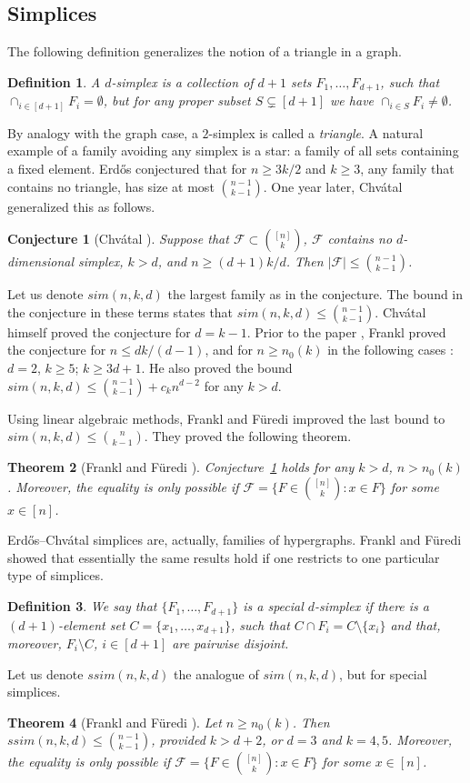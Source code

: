 \documentclass[graybox]{svmult}
\renewcommand{\le}{\leqslant}
\renewcommand{\ge}{\geqslant}
\newcommand{\ff}{\mathcal{F}}
\newtheorem{thm}{Theorem}
\newtheorem{conj}{Conjecture}
\newtheorem{defn}[thm]{Definition}
\begin{document}
\subsection{Simplices}\label{sec43}
The following definition generalizes the notion of a triangle in a graph.
\begin{defn}\label{defsim}
  A {\it $d$-simplex} is a collection of $d+1$ sets $F_1,\ldots, F_{d+1}$, such that $\cap_{i\in[d+1]} F_i=\emptyset$, but for any proper subset $S\subsetneq [d+1]$ we have $\cap_{i\in S} F_i\ne \emptyset$.
\end{defn}
By analogy with the graph case, a $2$-simplex is called a {\it triangle}. A natural example of a family avoiding any simplex is a star: a family of all sets containing a fixed element. Erd\H os \cite{E4} conjectured that for $n\ge 3k/2$ and $k\ge 3$, any family that contains no triangle, has size at most ${n-1\choose k-1}$. One year later, Chv\'atal \cite{Chv} generalized this as follows.
\begin{conj}[Chv\'atal \cite{Chv}]\label{conjchv} Suppose that $\ff\subset {[n]\choose k}$, $\ff$ contains no $d$-dimensional simplex, $k>d$,  and $n\ge (d+1)k/d$. Then $|\ff|\le {n-1\choose k-1}$.
\end{conj}
Let us denote $sim(n,k,d)$ the largest family as in the conjecture. The bound in the conjecture in these terms states that $sim(n,k,d)\le {n-1\choose k-1}$.
 Chv\'atal himself proved the conjecture for $d=k-1$. Prior to the paper \cite{FF2}, Frankl \cite{Fra76} proved the conjecture for $n\le dk/(d-1)$, and for $n\ge n_0(k)$ in the following cases \cite{Fra81}: $d=2$, $k\ge 5$; $k\ge 3d+1$. He also proved the bound $sim(n,k,d)\le {n-1\choose k-1}+c_kn^{d-2}$ for any $k>d$.

Using linear algebraic methods, Frankl and F\"uredi \cite{FF2} improved the last bound to $sim(n,k,d)\le {n\choose k-1}$. They proved the following theorem.
\begin{thm}[Frankl and F\"uredi \cite{FF2}]\label{thmff5}
Conjecture~\ref{conjchv} holds for any $k>d$, $n>n_0(k)$. Moreover, the equality is only possible if $\ff = \{F\in {[n]\choose k}: x\in F\}$ for some $x\in[n]$.
\end{thm}

Erd\H os--Chv\'atal simplices are, actually, families of hypergraphs. Frankl and F\"uredi showed that essentially the same results hold if one restricts to one particular type of simplices.
\begin{defn}\label{defssim}
  We say that $\{F_1,\ldots, F_{d+1}\}$ is a {\em special $d$-simplex} if there is a $(d+1)$-element set $C =\{x_1,\ldots, x_{d+1}\}$, such that $C\cap F_i = C\setminus \{x_i\}$ and that, moreover, $F_i\setminus C$, $i\in[d+1]$ are pairwise disjoint.
\end{defn}
Let us denote $ssim(n,k,d)$ the analogue of $sim(n,k,d)$, but for special simplices.
\begin{thm}[Frankl and F\"uredi \cite{FF2}]\label{thmff6}
  Let $n\ge n_0(k)$. Then $ssim(n,k,d)\le {n-1\choose k-1}$, provided $k>d+2$, or $d=3$ and $k=4,5$. Moreover, the equality is only possible if $\ff=\{F\in {[n]\choose k}: x\in F\}$ for some $x\in[n]$.
\end{thm}
\end{document}
